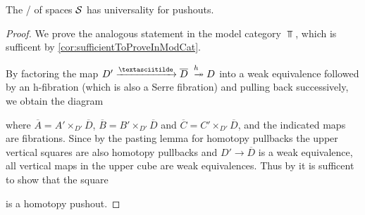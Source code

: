 \begin{prop} %
    The \inftycat/ of spaces $\mathcal{S}$ has universality for pushouts.
    \begin{proof}
        We prove the analogous statement in the model category $\Top$, which is sufficent by \cref{cor:sufficientToProveInModCat}.

        By factoring the map $D'\xrightarrow{\textasciitilde}\overline{D}\xtwoheadrightarrow{h} D$ into a weak equivalence followed by an h-fibration (which is also a Serre fibration) and pulling back successively, we obtain the diagram %
        \begin{center}
        \end{center}
        where $\overline{A}=A'\times_{D'}\overline{D}$, $\overline{B}=B'\times_{D'}\overline{D}$ and $\overline{C}=C'\times_{D'}\overline{D}$, and the indicated maps are fibrations.
        Since by the pasting lemma for homotopy pullbacks the upper vertical squares are also homotopy pullbacks and $D'\to\overline{D}$ is a weak equivalence, all vertical maps in the upper cube are weak equivalences.
        Thus by %
        it is sufficent to show that the square
        \begin{center}
        \end{center}
        is a homotopy pushout.


\end{proof}
\end{prop}
